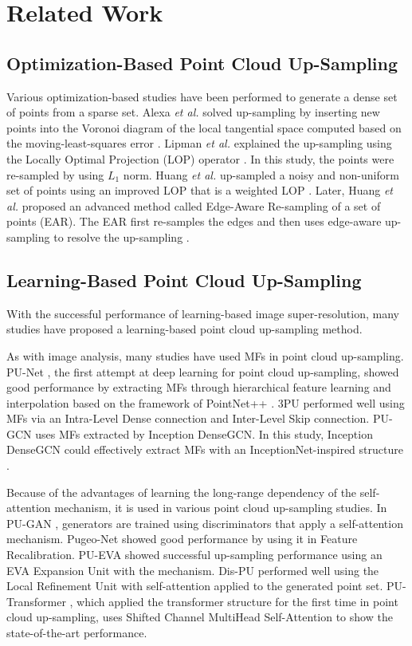 \documentclass{article}
\begin{document}
\section{Related Work}
\label{sec:related_works}
\subsection{Optimization-Based Point Cloud Up-Sampling}
\quad Various optimization-based studies have been performed to generate a dense set of points from a sparse set. Alexa \textit{et al.} solved up-sampling by inserting new points into the Voronoi diagram of the local tangential space computed based on the moving-least-squares error \cite{alexa2003computing}. Lipman \textit{et al.} explained the up-sampling using the Locally Optimal Projection (LOP) operator \cite{lipman2007parameterization}. In this study, the points were re-sampled by using $L_1$ norm. Huang \textit{et al.} up-sampled a noisy and non-uniform set of points using an improved LOP that is a weighted LOP \cite{huang2009consolidation}. Later, Huang \textit{et al.} proposed an advanced method called Edge-Aware Re-sampling of a set of points (EAR). The EAR first re-samples the edges and then uses edge-aware up-sampling to resolve the up-sampling \cite{huang2013edge}.

\subsection{Learning-Based Point Cloud Up-Sampling}
\quad With the successful performance of learning-based image super-resolution, many studies have proposed a learning-based point cloud up-sampling method.

\quad As with image analysis, many studies have used MFs in point cloud up-sampling. PU-Net \cite{yu2018pu}, the first attempt at deep learning for point cloud up-sampling, showed good performance by extracting MFs through hierarchical feature learning and interpolation based on the framework of PointNet++ \cite{qi2017pointnet++}. 3PU \cite{yifan2019patch} performed well using MFs via an Intra-Level Dense connection and Inter-Level Skip connection. PU-GCN \cite{qian2021pu} uses MFs extracted by Inception DenseGCN. In this study, Inception DenseGCN could effectively extract MFs with an InceptionNet-inspired structure \cite{szegedy2015going}.

\quad Because of the advantages of learning the long-range dependency of the self-attention mechanism, it is used in various point cloud up-sampling studies. In PU-GAN \cite{li2019pu}, generators are trained using discriminators that apply a self-attention mechanism. Pugeo-Net \cite{qian2020pugeo} showed good performance by using it in Feature Recalibration. PU-EVA \cite{luo2021pu} showed successful up-sampling performance using an EVA Expansion Unit with the mechanism. Dis-PU \cite{li2021point} performed well using the Local Refinement Unit with self-attention applied to the generated point set. PU-Transformer \cite{qiu2021pu}, which applied the transformer structure for the first time in point cloud up-sampling, uses Shifted Channel MultiHead Self-Attention to show the state-of-the-art performance.
\end{document}
